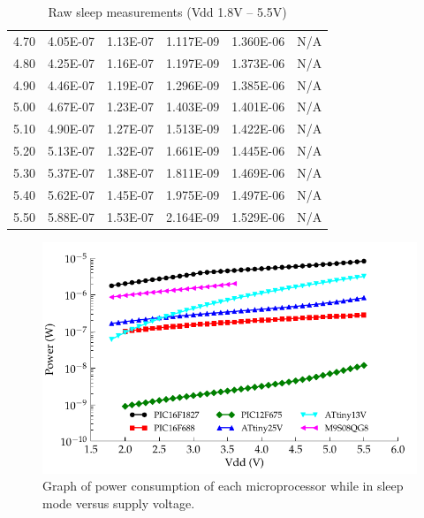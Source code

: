 \begin{table}[htp]
\begin{centering}
\begin{tabular}{|r|r|r|r|r|r|}
4.70  & 4.05E-07  & 1.13E-07  & 1.117E-09  & 1.360E-06  & N/A \tabularnewline
4.80  & 4.25E-07  & 1.16E-07  & 1.197E-09  & 1.373E-06  & N/A \tabularnewline
4.90  & 4.46E-07  & 1.19E-07  & 1.296E-09  & 1.385E-06  & N/A \tabularnewline
5.00  & 4.67E-07  & 1.23E-07  & 1.403E-09  & 1.401E-06  & N/A \tabularnewline
5.10  & 4.90E-07  & 1.27E-07  & 1.513E-09  & 1.422E-06  & N/A \tabularnewline
5.20  & 5.13E-07  & 1.32E-07  & 1.661E-09  & 1.445E-06  & N/A \tabularnewline
5.30  & 5.37E-07  & 1.38E-07  & 1.811E-09  & 1.469E-06  & N/A \tabularnewline
5.40  & 5.62E-07  & 1.45E-07  & 1.975E-09  & 1.497E-06  & N/A \tabularnewline
5.50  & 5.88E-07  & 1.53E-07  & 2.164E-09  & 1.529E-06  & N/A \tabularnewline
\hline
\end{tabular}
\par\end{centering}

\protect\caption{Raw sleep measurements (Vdd 1.8V -- 5.5V)}
\end{table}
\begin{figure}
\begin{centering}
\includegraphics{content/appendices/microprocessorPowerMeasurements/graphics/Graph_All_Sleeping_Power}
\par\end{centering}

\protect\caption{\label{fig:All_SleepPower}Graph of power consumption of each microprocessor while in sleep mode versus supply voltage.}


\end{figure}



